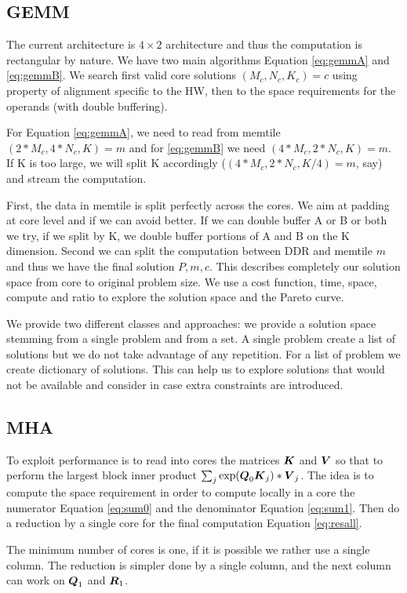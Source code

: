 \documentclass[conference]{IEEEtran}
\begin{document}
\subsection{GEMM}
The current architecture is $4\times 2$ architecture and thus the
computation is rectangular by nature. We have two main algorithms
Equation \ref{eq:gemmA} and \ref{eq:gemmB}. We search first valid core
solutions $(M_c,N_c,K_c)=c$ using property of alignment specific to
the HW, then to the space requirements for the operands (with double
buffering).

For Equation \ref{eq:gemmA}, we need to read from memtile
$(2*M_c,4*N_c,K)=m$ and for \ref{eq:gemmB} we need
$(4*M_c,2*N_c,K)=m$. If K is too large, we will split K accordingly
($(4*M_c,2*N_c,K/4)=m$, say) and stream the computation.

First, the data in memtile is split perfectly across the cores. We aim
at padding at core level and if we can avoid better.  If we can double
buffer A or B or both we try, if we split by K, we double buffer
portions of A and B on the K dimension. Second we can split the
computation between DDR and memtile $m$ and thus we have the final
solution $P,m,c$. This describes completely our solution space from
core to original problem size.  We use a cost function, time, space,
compute and ratio to explore the solution space and the Pareto curve.

We provide two different classes and approaches: we provide a solution
space stemming from a single problem and from a set. A single problem
create a list of solutions but we do not take advantage of any
repetition. For a list of problem we create dictionary of
solutions. This can help us to explore solutions that would not be
available and consider in case extra constraints are introduced.


\subsection{MHA}
To exploit performance is to read into cores the matrices ${\boldsymbol K}$ and
${\boldsymbol V}$ so that to perform the largest block inner product
$\sum_j\exp({\boldsymbol Q}_0{\boldsymbol K}_j)*{\boldsymbol V}_j$. The idea is to compute the
space requirement in order to compute locally in a core the numerator
Equation \ref{eq:sum0} and the denominator Equation
\ref{eq:sum1}. Then do a reduction by a single core for the final
computation Equation \ref{eq:resall}.

The minimum number of cores is one, if it is possible we rather use a
single column. The reduction is simpler done by a single column, and
the next column can work on ${\boldsymbol Q}_1$ and ${\boldsymbol R}_1$.
\end{document}
